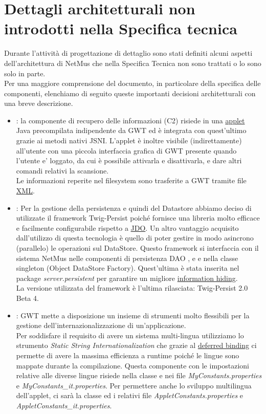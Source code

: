 \chapter{Dettagli architetturali non introdotti nella Specifica tecnica}
\thispagestyle{fancy} 
Durante l'attivit\`a di progettazione di dettaglio sono stati definiti alcuni
aspetti dell'architettura di NetMus che nella Specifica Tecnica non sono
trattati o lo sono solo in parte.\\ Per una maggiore comprensione del documento,
in particolare della specifica delle componenti, elenchiamo di seguito queste
importanti decisioni architetturali con una breve descrizione.
\begin{itemize}
  \item {} : la componente di recupero delle informazioni (C2) risiede
  in una \underline{applet}\\Java precompilata indipendente da GWT ed \`e integrata con
  quest'ultimo grazie ai metodi nativi JSNI. L'applet \`e inoltre visibile
  (indirettamente) all'utente con una piccola interfaccia grafica di GWT
  presente quando l'utente e' loggato, da cui \`e possibile
  attivarla e disattivarla, e dare altri comandi relativi la scansione.\\ Le
  informazioni reperite nel filesystem sono trasferite a GWT tramite file
  \underline{XML}.
  
  \item {} : Per la gestione della persistenza e
  quindi del Datastore abbiamo deciso di utilizzate il framework Twig-Persist poich\'e
  fornisce una libreria molto efficace e facilmente configurabile
  rispetto a \underline{JDO}. Un altro vantaggio acquisito dall'utilizzo di
  questa tecnologia \`e quello di poter gestire in modo asincrono (parallelo) le
  operazioni sul DataStore. Questo framework si interfaccia con il sistema
  NetMus nelle componenti di persistenza DAO ,  e
   e nella classe singleton  (Object DataStore
  Factory). Quest'ultima \`e stata inserita nel package \emph{server.persistent}
  per garantire un migliore \underline{information hiding}. \\
  La versione utilizzata del framework \`e l'ultima rilasciata: Twig-Persist 2.0
  Beta 4.
  
  \item {} : GWT mette a disposizione un insieme di
  strumenti molto flessibili per la gestione dell'internazionalizzazione di
  un'applicazione.\\ Per soddisfare il requisito di avere un sistema
  multi-lingua utilizziamo lo strumento \emph{Static String
  Internationalization} che grazie al \underline{deferred binding} ci permette
  di avere la massima efficienza a runtime poich\'e le lingue sono mappate durante la
  compilazione. Questa componente con le impostazioni relative alle
  diverse lingue risiede nella classe  e nei file
  \emph{MyConstants.properties} e \emph{MyConstants\_it.properties}. Per
  permettere anche lo sviluppo multilingua dell'applet, ci sar\`a la classe
   ed i relativi file \emph{AppletConstants.properties} e
  \emph{AppletConstants\_it.properties}.
  

\end{itemize}

